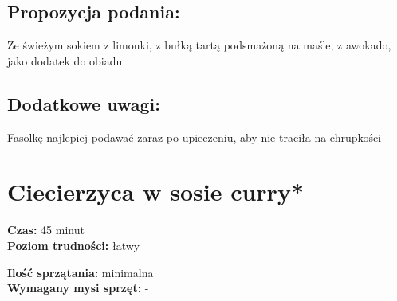 \documentclass[a4paper,10pt]{book}
\begin{document}
\vspace{0.5cm} 

\small
\section*{Propozycja podania:}
Ze świeżym sokiem z limonki, z bułką tartą podsmażoną na maśle, z awokado, jako dodatek do obiadu

\vspace{0.3cm}

\section*{Dodatkowe uwagi:}
Fasolkę najlepiej podawać zaraz po upieczeniu, aby nie traciła na chrupkości

\chapter{Ciecierzyca w sosie curry*}

\vspace{0.1cm}
\small
\begin{minipage}{0.45\textwidth}
    \noindent \textbf{Czas:} 45 minut \\
    \textbf{Poziom trudności:} łatwy 
\end{minipage}
\begin{minipage}{0.45\textwidth}
    \noindent \textbf{Ilość sprzątania:} minimalna\\
    \textbf{Wymagany mysi sprzęt:} -
\end{minipage}
\normalsize
\vspace{0.5cm}
\end{document}
